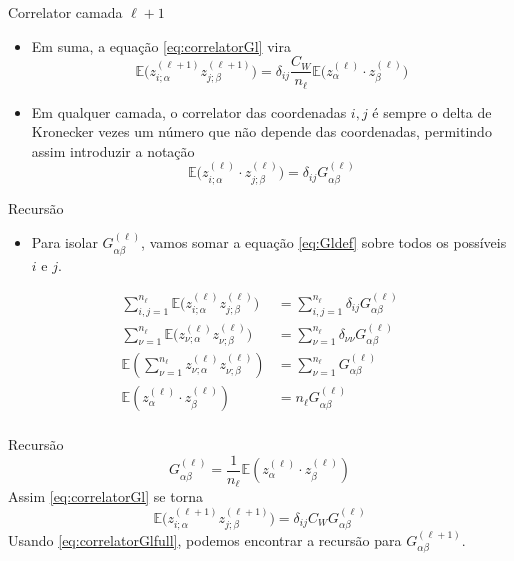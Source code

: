 \documentclass{beamer}
\newcommand{\EE}{\mathbb{E}}
\newcommand{\aaA}{\alpha}
\newcommand{\aaB}{\beta}
\def\eell{{(\ell)}}
\def\eellum{{(\ell+1)}}
\begin{document}
\begin{frame}{Correlator camada $\ell +1$}
	\begin{itemize}
		\item Em suma, a equação \eqref{eq:correlatorGl} vira 
		 \begin{equation*}
			\EE\big(z^\eellum_{i;\aaA} z^\eellum_{j;\aaB}\big) = \delta_{ij}\frac{C_W}{n_\ell} \EE\big(z^\eell_{\aaA}\cdot  z^\eell_{\aaB}\big)\tag{3.11}
		 \end{equation*}
		 \item Em qualquer camada, o correlator das coordenadas $i,j$ é sempre o delta de Kronecker vezes um número que não depende das coordenadas, permitindo assim introduzir a notação 
		 \begin{equation*}\tag{3.12}\label{eq:Gldef}
			\EE\big(z^\eell_{i;\aaA}\cdot z^\eell_{j;\aaB}\big) = \delta_{ij} G^\eell_{\aaA\aaB}  
		 \end{equation*}
	\end{itemize}
\end{frame}

\begin{frame}{Recursão}
	\begin{itemize}
		\item Para isolar $G^\eell_{\aaA\aaB}$, vamos somar a equação \eqref{eq:Gldef} sobre todos os possíveis $i$ e $j$.
	\end{itemize}
	\begin{align*}
		\sum_{i,j=1}^{n_\ell} \EE\big(z^\eell_{i;\aaA} z^\eell_{j;\aaB}\big) &= \sum_{i,j=1}^{n_\ell} \delta_{ij} G^\eell_{\aaA\aaB} \\
		\sum_{\nu=1}^{n_\ell} \EE\big(z^\eell_{\nu;\aaA} z^\eell_{\nu;\aaB}\big) &= \sum_{\nu=1}^{n_\ell} \delta_{\nu\nu}G^\eell_{\aaA\aaB} \\
		\EE\left(\sum_{\nu=1}^{n_\ell}z^\eell_{\nu;\aaA} z^\eell_{\nu;\aaB}\right) &= \sum_{\nu=1}^{n_\ell} G^\eell_{\aaA\aaB} \\
		\EE(z^\eell_{\aaA}\cdot z^\eell_{\aaB}) &= n_\ell G^\eell_{\aaA\aaB} \\
	\end{align*}
\end{frame}

\begin{frame}{Recursão}
	\begin{equation*}\tag{3.13}\label{eq:Gl}
		G^\eell_{\aaA\aaB} = \frac{1}{n_\ell}\EE(z^\eell_{\aaA}\cdot z^\eell_{\aaB})		
	\end{equation*}
	Assim \eqref{eq:correlatorGl} se torna
	\begin{equation*}\tag{3.11'}\label{eq:correlatorGlfull}
		\EE\big(z^\eellum_{i;\aaA} z^\eellum_{j;\aaB}\big) = \delta_{ij}C_WG^\eell_{\aaA\aaB}
	\end{equation*}
	Usando \eqref{eq:correlatorGlfull}, podemos encontrar a recursão para $G^\eellum_{\aaA\aaB}$.
\end{frame}
\end{document}
